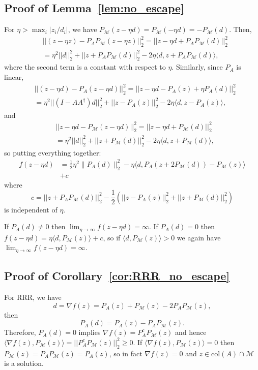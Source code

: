 \documentclass[12pt]{article}
\theoremstyle{definition}
\theoremstyle{remark}
\theoremstyle{definition}
\theoremstyle{problem}
\theoremstyle{definition}
\newcommand{\col}{\text{col}}
\newcommand{\MM}{\mathcal{M}}
\begin{document}
\subsection{Proof of Lemma~\ref{lem:no_escape}}\label{sec:pf_no_escape}

For $\eta>\max_i|z_i/d_i|$, we have $P_{\MM}(z-\eta d) = P_{\MM}(-\eta d) = -P_{\MM}(d)$. Then,
\[\begin{aligned} &||(z-\eta z) - P_AP_{\MM}(z-\eta z)||_2^2 = ||z-\eta d + P_AP_{\MM}(d)||_2^2\\
&= \eta^2||d||_2^2 + ||z + P_AP_{\MM}(d)||_2^2 - 2\eta\langle d, z + P_AP_{\MM}(d)\rangle,\end{aligned}\]
where the second term is a constant with respect to $\eta$. Similarly, since $P_A$ is linear,
\[\begin{aligned} &||(z-\eta d) - P_A(z-\eta d)||_2^2 = ||z-\eta d - P_A(z) + \eta P_A(d)||_2^2\\
&= \eta^2||(I-AA^{\dagger})d||_2^2 + ||z-P_A(z)||_2^2 - 2\eta \langle d, z-P_A(z)\rangle,\end{aligned}\]
and
\[\begin{aligned} &||z-\eta d - P_{\MM}(z-\eta d)||_2^2 = ||z-\eta d + P_{\MM}(d)||_2^2\\
&= \eta^2||d||_2^2 + ||z+P_{\MM}(d)||_2^2 - 2\eta\langle d, z+P_{\MM}(d)\rangle,\end{aligned}\]
so putting everything together:
\[\begin{aligned}
f(z-\eta d) &= \frac{1}{2}\eta^2 \|P_A(d)\|_2^2 - \eta\langle d, P_A(z + 2P_{\MM}(d)) - P_{\MM}(z)\rangle \\&+ c
\end{aligned}\]
where $$c = ||z + P_AP_{\MM}(d)||_2^2 - \frac{1}{2}\left(||z-P_A(z)||_2^2 + ||z+P_{\MM}(d)||_2^2\right)$$ is independent of $\eta$.

If $P_A(d)\neq 0$ then $\lim_{\eta\to\infty}f(z-\eta d)=\infty$. If $P_A(d) = 0$ then $f(z-\eta d) = \eta\langle d, P_{\MM}(z)\rangle + c$, so if $\langle d,P_{\MM}(z)\rangle > 0$ we again have $\lim_{\eta\to\infty}f(z-\eta d)=\infty$.

\subsection{Proof of Corollary~\ref{cor:RRR_no_escape}}\label{sec:pf_RRR_no_escape}

For RRR, we have $$d=\nabla f(z) = P_A(z) + P_{\MM}(z) - 2P_AP_{\MM}(z),$$ then $$P_A(d) = P_A(z) - P_AP_{\MM}(z).$$ Therefore, $P_A(d) = 0$ implies $\nabla f(z) = P_A^cP_{\MM}(z)$ and hence $\langle \nabla f(z), P_{\MM}(z)\rangle = ||P_A^cP_{\MM}(z)||_2^2 \geq 0$. If $\langle \nabla f(z), P_{\MM}(z)\rangle = 0$ then $P_{\MM}(z) = P_AP_{\MM}(z) = P_A(z)$, so in fact $\nabla f(z) = 0$ and $z\in\col(A)\cap\MM$ is a solution.
\end{document}
